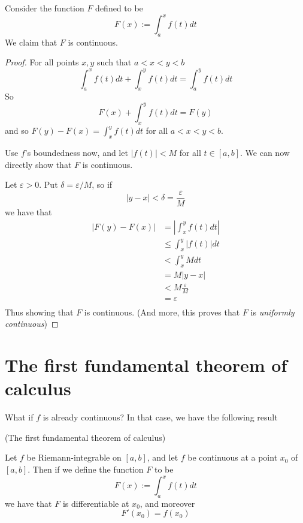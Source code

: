 \documentclass{article}
\begin{document}
Consider the function $F$ defined to be
\[
    F(x) := \int_a^x f(t)dt
\]
We claim that $F$ is continuous. 
\begin{proof}
    For all points $x, y$ such that $a<x<y<b$
    \[
        \int_a^x f(t)dt + \int_x^y f(t)dt = \int_a^y f(t)dt
    \]
    So
    \[
        F(x) + \int_x^y f(t)dt = F(y)
    \]
    and so $F(y)-F(x) = \displaystyle\int_x^y f(t)dt$ for all $a < x < y < b$.

    Use $f$'s boundedness now, and let $|f(t)|<M$ for all $t \in [a,b]$. We can now directly show that $F$ is continuous.

    Let $\varepsilon > 0$. Put $\delta = \varepsilon/M$, so if 
    \[
        |y - x| < \delta = \frac{\varepsilon}{M}
    \]
     we have that
     \begin{align*}
         |F(y)-F(x)| &= \left|\int_x^yf(t)dt\right| \\
                     &\leq \int_x^y |f(t)|dt \\
                     &< \int_x^y M dt \\
                     &= M|y-x| \\
                     &< M\frac{\varepsilon}{M} \\
                     &= \varepsilon \\
     \end{align*}
     Thus showing that $F$ is continuous. (And more, this proves that $F$ is \emph{uniformly continuous})

\end{proof}

\section{The first fundamental theorem of calculus}

What if $f$ is already continuous? In that case, we have the following result
\begin{theorem}{(The first fundamental theorem of calculus)}

    Let $f$ be Riemann-integrable on $[a, b]$, and let $f$ be continuous at a point $x_0$ of $[a, b]$. Then if we define the function $F$ to be
    \[
        F(x) := \int_a^x f(t)dt
    \]
    we have that $F$ is differentiable at $x_0$, and moreover
    \[
        F'(x_0) = f(x_0)
    \]
\end{theorem}
\end{document}
